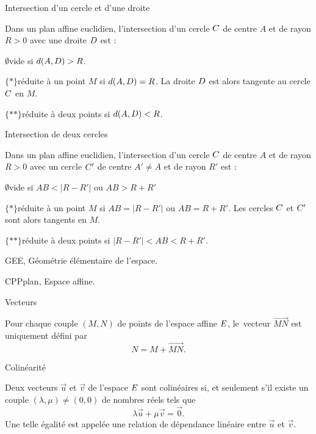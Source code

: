 \Concept [] Intersection d'un cercle et d'une droite

\noindent
Dans un plan affine euclidien, l'intersection d'un cercle $\sc C$ de centre $A$ et de rayon $R>0$ avec une droite $\sc D$ est :
\medskip

\noindent
\item{$\emptyset$}vide si $d(A,\sc D)>R$. 
\medskip

\noindent
\item{$\{*\}$}r\'eduite \`a un point $M$ si $d(A,\sc D)=R$. La droite $\sc D$ est alors tangente au cercle $\sc C$ en $M$. 
\medskip

\noindent
\item{$\{**\}$}r\'eduite \`a deux points si $d(A,\sc D)<R$. 
\medskip


\Concept [] Intersection de deux cercles

\noindent
Dans un plan affine euclidien, l'intersection d'un cercle $\sc C$ de centre $A$ et de rayon $R>0$ avec un cercle $\sc C'$ de centre $A'\neq A$ et de rayon $R'$ est :
\medskip
\noindent
\item{$\emptyset$}vide si $AB<|R-R'|$ ou $AB>R+R'$
\medskip
\noindent
\item{$\{*\}$}r\'eduite \`a un point $M$ si $AB=|R-R'|$ ou $AB=R+R'$. Les cercles $\sc C$ et $\sc C'$ sont alors tangents en $M$. 
\medskip
\noindent
\item{$\{**\}$}r\'eduite \`a deux points si $|R-R'|<AB<R+R'$. 










\Chapter GEE, G\'eom\'etrie \'el\'ementaire de l'espace.

\Section CPPplan, Espace affine. 

\Concept [] Vecteurs
 
\noindent
Pour chaque couple $(M,N)$ de points de l'espace affine $\sc E$, le~vecteur $\vec{MN}$ est uniquement d\'efini par 
$$
N=M+\vec{MN}.
$$

\Concept [] Colin\'earit\'e 

\noindent
Deux vecteurs $\vec u$ et $\vec v$ de l'espace $\sc E$ sont colin\'eaires si, et seulement s'il existe un couple $(\lambda,\mu)\neq(0,0)$ de nombres r\'eels tels que 
$$
\lambda \vec u+\mu\vec v=\vec 0.
$$
Une telle \'egalit\'e est appel\'ee une relation de d\'ependance lin\'eaire entre $\vec u$ et $\vec v$. 
\bigskip

